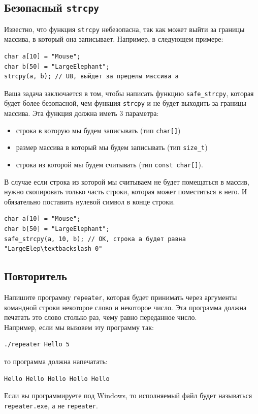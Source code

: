 \documentclass[10pt]{article}
\begin{document}
\subsection{Безопасный \texttt{strcpy}}
Известно, что функция \texttt{strcpy} небезопасна, так как может выйти за границы массива, в который она записывает.
Например, в следующем примере:
\begin{lstlisting}
char a[10] = "Mouse";
char b[50] = "LargeElephant";
strcpy(a, b); // UB, выйдет за пределы массива a
\end{lstlisting}
Ваша задача заключается в том, чтобы написать функцию \texttt{safe\_strcpy}, которая будет более безопасной, чем функция \texttt{strcpy} и не будет выходить за границы массива. Эта функция должна иметь 3 параметра:
\begin{itemize}
\item строка в которую мы будем записывать (тип \texttt{char[]})
\item размер массива в который мы будем записывать (тип \texttt{size\_t})
\item строка из которой мы будем считывать (тип \texttt{const char[]}).
\end{itemize}
В случае если строка из которой мы считываем не будет помещаться в массив, нужно скопировать только часть строки, которая может поместиться в него. И обязательно поставить нулевой символ в конце строки.
\begin{lstlisting}
char a[10] = "Mouse";
char b[50] = "LargeElephant";
safe_strcpy(a, 10, b); // OK, строка a будет равна "LargeElep\textbackslash 0"
\end{lstlisting}


\newpage
\subsection{Повторитель}
Напишите программу \texttt{repeater}, которая будет принимать через аргументы командной строки некоторое слово и некоторое число. Эта программа должна печатать это слово столько раз, чему равно переданное число.\\
Например, если мы вызовем эту программу так:
\begin{lstlisting}
./repeater Hello 5
\end{lstlisting}
то программа должна напечатать:
\begin{lstlisting}
Hello Hello Hello Hello Hello
\end{lstlisting}
Если вы программируете под Windows, то исполняемый файл будет называться \texttt{repeater.exe}, а не \texttt{repeater}.
\end{document}
